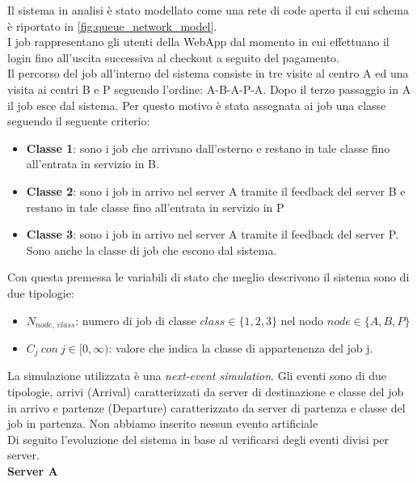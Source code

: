 Il sistema in analisi è stato modellato come una rete di code aperta il cui schema è riportato in \autoref{fig:queue_network_model}.\\
I job rappresentano gli utenti della WebApp dal momento in cui effettuano il login fino all'uscita successiva al checkout a seguito del pagamento.\\
Il percorso del job all'interno del sistema consiste in tre visite al centro A ed una visita ai centri B e P seguendo l'ordine: A-B-A-P-A. Dopo il terzo passaggio in A il job esce dal sistema. Per questo motivo è stata assegnata ai job una classe seguendo il seguente criterio:
\begin{itemize}
    \item \textbf{Classe 1}: sono i job che arrivano dall'esterno e restano in tale classe fino all'entrata in servizio in B.
    \item \textbf{Classe 2}: sono i job in arrivo nel server A tramite il feedback del server B e restano in tale classe fino all'entrata in servizio in P
    \item \textbf{Classe 3}: sono i job in arrivo nel server A tramite il feedback del server P. Sono anche la classe di job che escono dal sistema.
\end{itemize}
Con questa premessa le variabili di stato che meglio descrivono il sistema sono di due tipologie:
\begin{itemize}
    \item $N_{node,\ class}$: numero di job di classe $class \in \{1,2,3\}$ nel nodo $node \in \{A,B,P\}$
    \item $C_j\ con\ j \in [0, \infty)$: valore che indica la classe di appartenenza del job j.
\end{itemize}
La simulazione utilizzata è una \textit{next-event simulation}. Gli eventi sono di due tipologie, arrivi (Arrival) caratterizzati da server di destinazione e classe del job in arrivo e partenze (Departure) caratterizzato da server di partenza e classe del job in partenza. Non abbiamo inserito nessun evento artificiale\\
Di seguito l'evoluzione del sistema in base al verificarsi degli eventi divisi per server.\\
\textbf{Server A}

